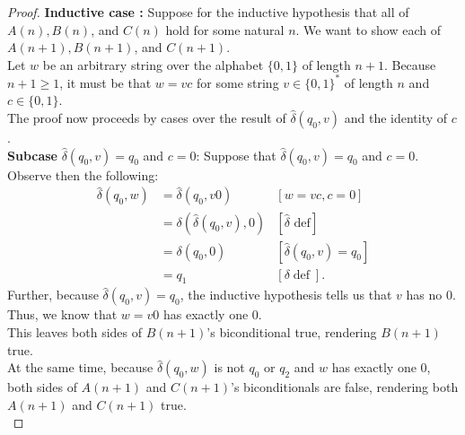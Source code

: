 \documentclass[10pt]{article}
\begin{document}
\begin{enumerate}[label={}]
\begin{proof}
              \textbf{Inductive case :} Suppose for the inductive hypothesis that all of $A(n), B(n)$, and $C(n)$ hold for some natural $n$. We want to show each of $A(n+1), B(n+1)$, and $C(n+1)$.\\
              Let $w$ be an arbitrary string over the alphabet $\{0,1\}$ of length $n+1$. Because $n+1 \geq 1$, it must be that $w=v c$ for some string $v \in\{0,1\}^*$ of length $n$ and $c \in\{0,1\}$.\\
              The proof now proceeds by cases over the result of $\hat{\delta}\left(q_0, v\right)$ and the identity of $c$.\\

              \textbf{Subcase }$\hat{\delta}\left(q_0, v\right)=q_0$ and $c=0$: Suppose that $\hat{\delta}\left(q_0, v\right)=q_0$ and $c=0$. Observe then the following:
              $$
                  \begin{aligned}
                      \hat{\delta}\left(q_0, w\right) & =\hat{\delta}\left(q_0, v 0\right)                     & {[w=v c, c=0] }                                     \\
                                                      & =\delta\left(\hat{\delta}\left(q_0, v\right), 0\right) & {[\hat{\delta} \text { def}] }                      \\
                                                      & =\delta\left(q_0, 0\right)                             & {\left[\hat{\delta}\left(q_0, v\right)=q_0\right] } \\
                                                      & =q_1                                                   & {[\delta \operatorname{def}] . }
                  \end{aligned}
              $$
              Further, because $\hat{\delta}\left(q_0, v\right)=q_0$, the inductive hypothesis tells us that $v$ has no 0. Thus, we know that $w=v0$ has exactly one 0.\\
              This leaves both sides of $B(n+1)$'s biconditional true, rendering $B(n+1)$ true.\\
              At the same time, because $\hat{\delta}\left(q_0, w\right)$ is not $q_0$ or $q_2$ and $w$ has exactly one 0, both sides of $A(n+1)$ and $C(n+1)$'s biconditionals are false, rendering both $A(n+1)$ and $C(n+1)$ true.\\


\end{proof}
\end{enumerate}
\end{document}
